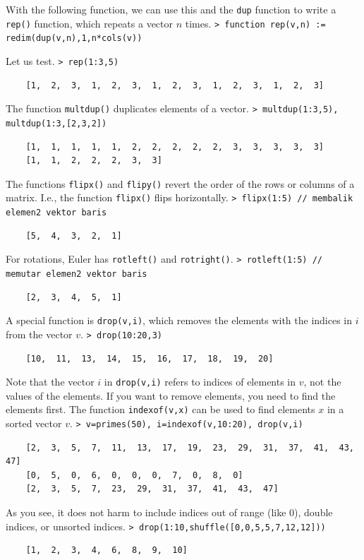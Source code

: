 \documentclass[11pt, a4paper]{article}
\newcommand{\emtcmd}[1]{\noindent\texttt{\textcolor{emtcommand}{>}\ #1}\par\smallskip}
\begin{document}
With the following function, we can use this and the \texttt{dup} function to write a \texttt{rep()} function, which repeats a vector $n$ times.
\emtcmd{function rep(v,n) := redim(dup(v,n),1,n*cols(v))}

Let us test.
\emtcmd{rep(1:3,5)}
\begin{verbatim}
    [1,  2,  3,  1,  2,  3,  1,  2,  3,  1,  2,  3,  1,  2,  3]
\end{verbatim}

The function \texttt{multdup()} duplicates elements of a vector.
\emtcmd{multdup(1:3,5), multdup(1:3,[2,3,2])}
\begin{verbatim}
    [1,  1,  1,  1,  1,  2,  2,  2,  2,  2,  3,  3,  3,  3,  3]
    [1,  1,  2,  2,  2,  3,  3]
\end{verbatim}

The functions \texttt{flipx()} and \texttt{flipy()} revert the order of the rows or columns of a matrix. I.e., the function \texttt{flipx()} flips horizontally.
\emtcmd{flipx(1:5) \textcolor{emtcomment}{// membalik elemen2 vektor baris}}
\begin{verbatim}
    [5,  4,  3,  2,  1]
\end{verbatim}

For rotations, Euler has \texttt{rotleft()} and \texttt{rotright()}.
\emtcmd{rotleft(1:5) \textcolor{emtcomment}{// memutar elemen2 vektor baris}}
\begin{verbatim}
    [2,  3,  4,  5,  1]
\end{verbatim}

A special function is \texttt{drop(v,i)}, which removes the elements with the indices in $i$ from the vector $v$.
\emtcmd{drop(10:20,3)}
\begin{verbatim}
    [10,  11,  13,  14,  15,  16,  17,  18,  19,  20]
\end{verbatim}

Note that the vector $i$ in \texttt{drop(v,i)} refers to indices of elements in $v$, not the values of the elements. If you want to remove elements, you need to find the elements first. The function \texttt{indexof(v,x)} can be used to find elements $x$ in a sorted vector $v$.
\emtcmd{v=primes(50), i=indexof(v,10:20), drop(v,i)}
\begin{verbatim}
    [2,  3,  5,  7,  11,  13,  17,  19,  23,  29,  31,  37,  41,  43,  47]
    [0,  5,  0,  6,  0,  0,  0,  7,  0,  8,  0]
    [2,  3,  5,  7,  23,  29,  31,  37,  41,  43,  47]
\end{verbatim}

As you see, it does not harm to include indices out of range (like 0), double indices, or unsorted indices.
\emtcmd{drop(1:10,shuffle([0,0,5,5,7,12,12]))}
\begin{verbatim}
    [1,  2,  3,  4,  6,  8,  9,  10]
\end{verbatim}
\end{document}
